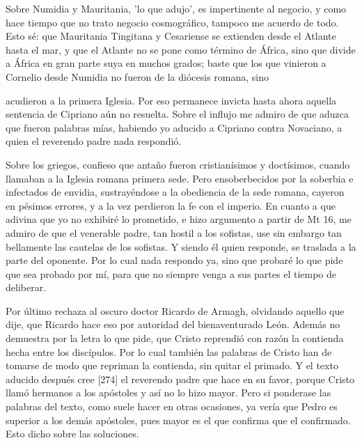Sobre Numidia y Mauritania, 'lo que adujo', es impertinente al negocio, y como hace tiempo que no trato negocio cosmográfico, tampoco me acuerdo de todo. Esto sé: que Mauritania Tingitana y Cesariense se extienden desde el Atlante hasta el mar, y que el Atlante no se pone como término de África, sino que divide a África en gran parte suya en muchos grados; baste que los que vinieron a Cornelio desde Numidia no fueron de la diócesis romana, sino

acudieron a la primera Iglesia. Por eso permanece invicta hasta ahora aquella sentencia de Cipriano aún no resuelta. Sobre el influjo me admiro de que aduzca que fueron palabras mías, habiendo yo aducido a Cipriano contra Novaciano, a quien el reverendo padre nada respondió.

Sobre los griegos, confieso que antaño fueron cristianísimos y doctísimos, cuando llamaban a la Iglesia romana primera sede. Pero ensoberbecidos por la soberbia e infectados de envidia, sustrayéndose a la obediencia de la sede romana, cayeron en pésimos errores, y a la vez perdieron la fe con el imperio. En cuanto a que adivina que yo no exhibiré lo prometido, e hizo argumento a partir de Mt 16, me admiro de que el venerable padre, tan hostil a los sofistas, use sin embargo tan bellamente las cautelas de los sofistas. Y siendo él quien responde, se traslada a la parte del oponente. Por lo cual nada respondo ya, sino que probaré lo que pide que sea probado por mí, para que no siempre venga a sus partes el tiempo de deliberar.

Por último rechaza al oscuro doctor Ricardo de Armagh, olvidando aquello que dije, que Ricardo hace eso por autoridad del bienaventurado León. Además no demuestra por la letra lo que pide, que Cristo reprendió con razón la contienda hecha entre los discípulos. Por lo cual también las palabras de Cristo han de tomarse de modo que repriman la contienda, sin quitar el primado. Y el texto aducido después cree [274] el reverendo padre que hace en su favor, porque Cristo llamó hermanos a los apóstoles y así no lo hizo mayor. Pero si ponderase las palabras del texto, como suele hacer en otras ocasiones, ya vería que Pedro es superior a los demás apóstoles, pues mayor es el que confirma que el confirmado. Esto dicho sobre las soluciones.

